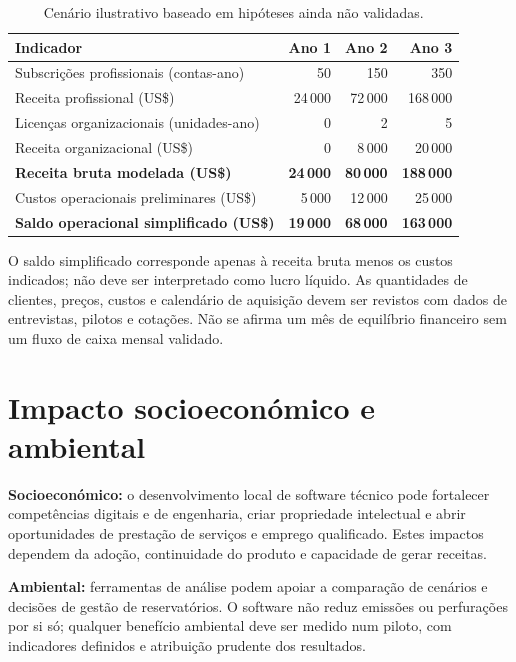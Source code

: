 \documentclass[11pt,a4paper]{article}
\newcommand{\usd}{US\$}
\begin{document}
\begin{table}[ht]
\centering
\small
\begin{tabularx}{\textwidth}{X r r r}
  \toprule
  \textbf{Indicador} & \textbf{Ano 1} & \textbf{Ano 2} & \textbf{Ano 3} \\
  \midrule
  Subscrições profissionais (contas-ano) & 50 & 150 & 350 \\
  Receita profissional (\usd) & 24\,000 & 72\,000 & 168\,000 \\
  Licenças organizacionais (unidades-ano) & 0 & 2 & 5 \\
  Receita organizacional (\usd) & 0 & 8\,000 & 20\,000 \\
  \textbf{Receita bruta modelada (\usd)} & \textbf{24\,000} & \textbf{80\,000} & \textbf{188\,000} \\
  Custos operacionais preliminares (\usd) & 5\,000 & 12\,000 & 25\,000 \\
  \textbf{Saldo operacional simplificado (\usd)} & \textbf{19\,000} & \textbf{68\,000} & \textbf{163\,000} \\
  \bottomrule
\end{tabularx}
\caption{Cenário ilustrativo baseado em hipóteses ainda não validadas.}
\end{table}

O saldo simplificado corresponde apenas à receita bruta menos os custos indicados;
não deve ser interpretado como lucro líquido. As quantidades de clientes, preços,
custos e calendário de aquisição devem ser revistos com dados de entrevistas, pilotos
e cotações. Não se afirma um mês de equilíbrio financeiro sem um fluxo de caixa
mensal validado.

\section{Impacto socioeconómico e ambiental}

\textbf{Socioeconómico:} o desenvolvimento local de software técnico pode fortalecer
competências digitais e de engenharia, criar propriedade intelectual e abrir
oportunidades de prestação de serviços e emprego qualificado. Estes impactos
dependem da adoção, continuidade do produto e capacidade de gerar receitas.

\textbf{Ambiental:} ferramentas de análise podem apoiar a comparação de cenários e
decisões de gestão de reservatórios. O software não reduz emissões ou perfurações
por si só; qualquer benefício ambiental deve ser medido num piloto, com indicadores
definidos e atribuição prudente dos resultados.
\end{document}
